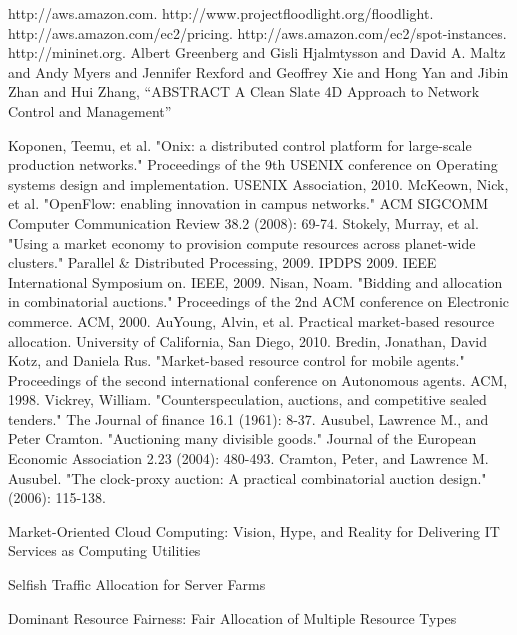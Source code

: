 \documentclass[a4paper,11pt,twocolumn]{article}
\begin{document}
\begin{thebibliography}{99}
   

  http://aws.amazon.com.
  http://www.projectfloodlight.org/floodlight.
  http://aws.amazon.com/ec2/pricing.
  http://aws.amazon.com/ec2/spot-instances.
  http://mininet.org.
Albert Greenberg and Gisli Hjalmtysson and David A. Maltz and Andy Myers and Jennifer Rexford and Geoffrey Xie and Hong Yan and Jibin Zhan and Hui Zhang,
     ``ABSTRACT A Clean Slate 4D Approach to Network Control and Management''

  Koponen, Teemu, et al. "Onix: a distributed control platform for large-scale production networks." Proceedings of the 9th USENIX conference on Operating systems design and implementation. USENIX Association, 2010.
  McKeown, Nick, et al. "OpenFlow: enabling innovation in campus networks." ACM SIGCOMM Computer Communication Review 38.2 (2008): 69-74.
  Stokely, Murray, et al. "Using a market economy to provision compute resources across planet-wide clusters." Parallel \& Distributed Processing, 2009. IPDPS 2009. IEEE International Symposium on. IEEE, 2009.
  Nisan, Noam. "Bidding and allocation in combinatorial auctions." Proceedings of the 2nd ACM conference on Electronic commerce. ACM, 2000.
  AuYoung, Alvin, et al. Practical market-based resource allocation. University of California, San Diego, 2010.
  Bredin, Jonathan, David Kotz, and Daniela Rus. "Market-based resource control for mobile agents." Proceedings of the second international conference on Autonomous agents. ACM, 1998.
  Vickrey, William. "Counterspeculation, auctions, and competitive sealed tenders." The Journal of finance 16.1 (1961): 8-37.
  Ausubel, Lawrence M., and Peter Cramton. "Auctioning many divisible goods." Journal of the European Economic Association 2.23 (2004): 480-493.
  Cramton, Peter, and Lawrence M. Ausubel. "The clock-proxy auction: A practical combinatorial auction design." (2006): 115-138.
 

 Market-Oriented Cloud Computing:  
Vision, Hype, and Reality for Delivering IT Services as Computing Utilities

Selfish Traffic Allocation for Server Farms


Dominant Resource Fairness: Fair Allocation of Multiple Resource Types


\end{thebibliography}
\end{document}
